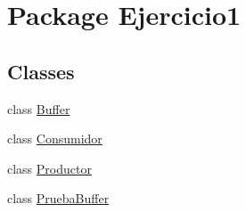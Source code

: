 \hypertarget{namespace_ejercicio1}{}\section{Package Ejercicio1}
\label{namespace_ejercicio1}
\subsection*{Classes}
\begin{DoxyCompactItemize}
\item 
class \mbox{\hyperlink{class_ejercicio1_1_1_buffer}{Buffer}}
\item 
class \mbox{\hyperlink{class_ejercicio1_1_1_consumidor}{Consumidor}}
\item 
class \mbox{\hyperlink{class_ejercicio1_1_1_productor}{Productor}}
\item 
class \mbox{\hyperlink{class_ejercicio1_1_1_prueba_buffer}{Prueba\+Buffer}}
\end{DoxyCompactItemize}

